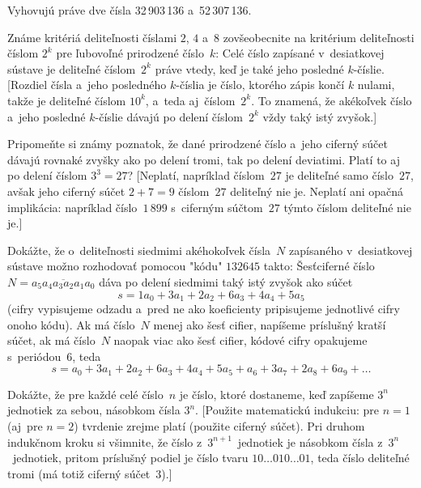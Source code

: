 {\odpoved
Vyhovujú práve dve čísla
32\,903\,136 a~52\,307\,136.

Známe kritériá deliteľnosti číslami $2$, $4$ a~$8$ zovšeobecnite
na kritérium deliteľnosti číslom $2^k$ pre ľubovoľné prirodzené
číslo~$k$: Celé číslo zapísané v~desiatkovej sústave je deliteľné
číslom~$2^k$ práve vtedy, keď je také jeho posledné $k$-číslie.
[Rozdiel čísla a~jeho posledného $k$-číslia je číslo, ktorého zápis
končí $k$ nulami, takže je deliteľné číslom $10^k$, a~teda
aj~číslom~$2^k$. To znamená, že akékoľvek číslo a~jeho posledné
$k$-číslie dávajú po delení číslom~$2^k$ vždy taký istý zvyšok.]

Pripomeňte si známy poznatok, že dané prirodzené číslo
a~jeho ciferný súčet dávajú rovnaké zvyšky ako po delení tromi,
tak po delení deviatimi. Platí to aj po delení číslom $3^3=27$?
[Neplatí, napríklad číslom~$27$ je deliteľné samo číslo~$27$, avšak
jeho ciferný súčet $2+7=9$ číslom~$27$ deliteľný nie je. Neplatí ani
opačná implikácia: napríklad číslo~$1\,899$ s~ciferným súčtom~$27$
týmto číslom deliteľné nie je.]

\D
Dokážte, že o~deliteľnosti siedmimi akéhokoľvek čísla~$N$
zapísaného v~desiatkovej sústave možno rozhodovať pomocou "kódu"
$132645$ takto:
Šesťciferné číslo $N=\overline{a_5a_4a_3a_2a_1a_0}$
dáva po delení siedmimi taký istý zvyšok ako súčet
$$
s=1a_0+3a_1+2a_2+6a_3+4a_4+5a_5
$$
(cifry vypisujeme odzadu a~pred ne ako koeficienty pripisujeme
jednotlivé cifry onoho kódu).
Ak má číslo~$N$ menej ako šesť cifier, napíšeme
príslušný kratší súčet, ak má číslo~$N$ naopak viac ako šesť cifier,
kódové cifry opakujeme s~periódou~$6$, teda
$$
s=a_0+3a_1+2a_2+6a_3+4a_4+5a_5+a_6+3a_7+2a_8+6a_9+\dots
$$

Dokážte, že pre každé celé číslo~$n$ je číslo, ktoré
dostaneme, keď zapíšeme $3^n$ jednotiek za sebou,
násobkom čísla $3^n$. [Použite matematickú
indukciu: pre $n=1$ (aj~pre $n=2$) tvrdenie zrejme platí (použite
ciferný súčet). Pri druhom indukčnom kroku si všimnite, že číslo
z~$3^{n+1}$~jednotiek je násobkom čísla z~$3^n$~jednotiek,
pritom príslušný podiel je číslo tvaru $10\dots010\dots01$,
teda číslo deliteľné tromi (má totiž ciferný súčet~$3$).]
}

